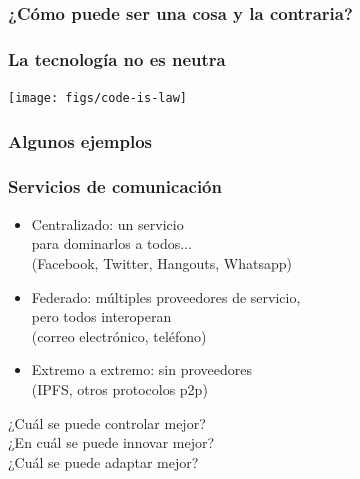 \documentclass[17pt,aspectratio=169,hyperref=pdfusetitle]{beamer}
\begin{document}
\begin{frame}[fragile]
  \frametitle{¿Cómo puede ser una cosa y la contraria?}


\end{frame}

\begin{frame}[fragile]
  \frametitle{La tecnología no es neutra}

  \begin{center}
  \texttt{[image: figs/code-is-law]}
  \end{center}

\end{frame}

\begin{frame}[fragile]
  \frametitle{Algunos ejemplos}


\end{frame}

\begin{frame}
\frametitle{Servicios de comunicación}

  \begin{itemize}
  \item Centralizado: un servicio \\
    para dominarlos a todos... \\
    (Facebook, Twitter, Hangouts, Whatsapp)
  \item Federado: múltiples proveedores de servicio, \\
    pero todos interoperan \\
    (correo electrónico, teléfono)
  \item Extremo a extremo: sin proveedores \\
    (IPFS, otros protocolos p2p)
  \end{itemize}

  \begin{flushright}
¿Cuál se puede controlar mejor? \\

¿En cuál se puede innovar mejor? \\

    ¿Cuál se puede adaptar mejor? \\
    \end{flushright}

\end{frame}
\end{document}
